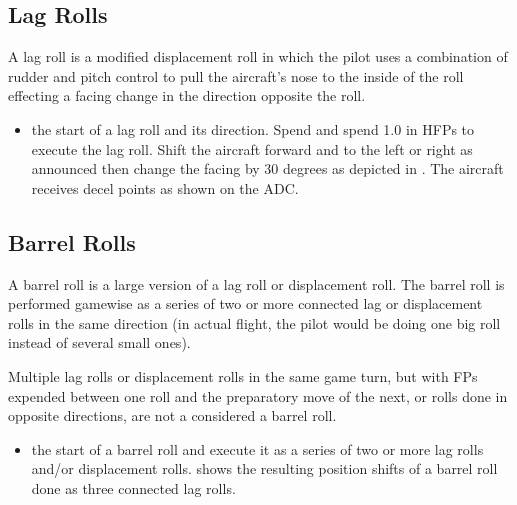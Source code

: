 \subsection{Lag Rolls}

A lag roll is a modified displacement roll in which the pilot uses a combination of rudder and pitch control to pull the aircraft's nose to the inside of the roll effecting a facing change in the direction opposite the roll.

\begin{itemize}
    \item{}  the start of a lag roll and its direction. Spend  and spend 1.0 in HFPs to execute the lag roll. Shift the aircraft forward and to the left or right as announced then change the facing by 30 degrees as depicted in  . The aircraft receives decel points as shown on the ADC.
\end{itemize}

\subsection{Barrel Rolls}


A barrel roll is a large version of a lag roll or displacement roll. The barrel roll is performed gamewise as a series of two or more connected lag or displacement rolls in the same direction (in actual flight, the pilot would be doing one big roll instead of several small ones).

Multiple lag rolls or displacement rolls in the same game turn, but with FPs expended between one roll and the preparatory move of the next, or rolls done in opposite directions, are not a considered a barrel roll.

\begin{itemize}
    \item{}  the start of a barrel roll and execute it as a series of two or more lag rolls and/or displacement rolls.  shows the resulting position shifts of a barrel roll done as three connected lag rolls.
\end{itemize}

